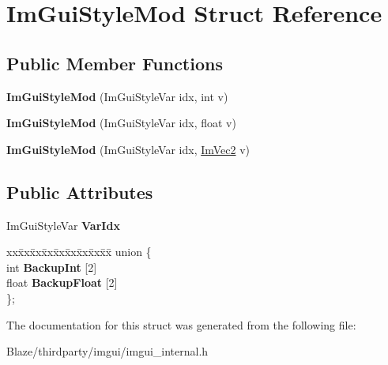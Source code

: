\hypertarget{structImGuiStyleMod}{}\section{Im\+Gui\+Style\+Mod Struct Reference}
\label{structImGuiStyleMod}
\subsection*{Public Member Functions}
\begin{DoxyCompactItemize}
\item 
\mbox{\label{structImGuiStyleMod_ae9987273b247f021020034256364bec8}} 
{\bfseries Im\+Gui\+Style\+Mod} (Im\+Gui\+Style\+Var idx, int v)
\item 
\mbox{\label{structImGuiStyleMod_a737c3fad802a8d5d4616f9decc7e402d}} 
{\bfseries Im\+Gui\+Style\+Mod} (Im\+Gui\+Style\+Var idx, float v)
\item 
\mbox{\label{structImGuiStyleMod_a28647cc4ab8b95b8ee30e0fc7401ae07}} 
{\bfseries Im\+Gui\+Style\+Mod} (Im\+Gui\+Style\+Var idx, \hyperlink{structImVec2}{Im\+Vec2} v)
\end{DoxyCompactItemize}
\subsection*{Public Attributes}
\begin{DoxyCompactItemize}
\item 
\mbox{\label{structImGuiStyleMod_ab23c55941dbd0e156ce640a8fecb2feb}} 
Im\+Gui\+Style\+Var {\bfseries Var\+Idx}
\item 
\mbox{\label{structImGuiStyleMod_a66d9f827b3838201efe538bed0b68d52}} 
\begin{tabbing}
xx\=xx\=xx\=xx\=xx\=xx\=xx\=xx\=xx\=\kill
union \{\\
\>int {\bfseries BackupInt} \mbox{[}2\mbox{]}\\
\>float {\bfseries BackupFloat} \mbox{[}2\mbox{]}\\
\}; \\

\end{tabbing}\end{DoxyCompactItemize}


The documentation for this struct was generated from the following file\+:\begin{DoxyCompactItemize}
\item 
Blaze/thirdparty/imgui/imgui\+\_\+internal.\+h\end{DoxyCompactItemize}
